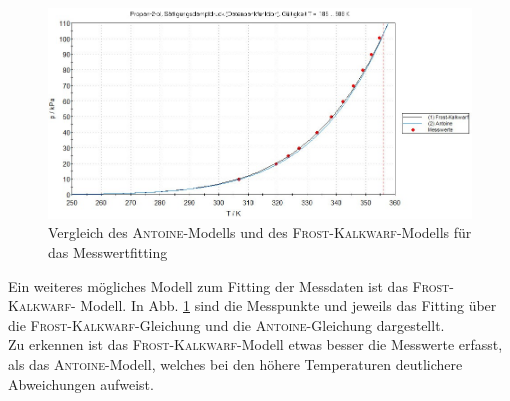 \begin{figure}[h!]
	\centering
	\includegraphics[width=1.0\textwidth]{img/vergleich}
	\caption{Vergleich des \textsc{Antoine}-Modells und des \textsc{Frost-Kalkwarf}-Modells für das Messwertfitting}
	\label{fig:vergleich}
\end{figure}
\FloatBarrier
Ein weiteres mögliches Modell zum Fitting der Messdaten ist das \textsc{Frost-Kalkwarf}- Modell. In Abb. \ref{fig:vergleich} sind die Messpunkte und jeweils das Fitting über die \textsc{Frost-Kalkwarf}-Gleichung und die \textsc{Antoine}-Gleichung dargestellt. \\
Zu erkennen ist das \textsc{Frost-Kalkwarf}-Modell etwas besser die Messwerte erfasst, als das \textsc{Antoine}-Modell, welches bei den höhere Temperaturen deutlichere Abweichungen aufweist.
